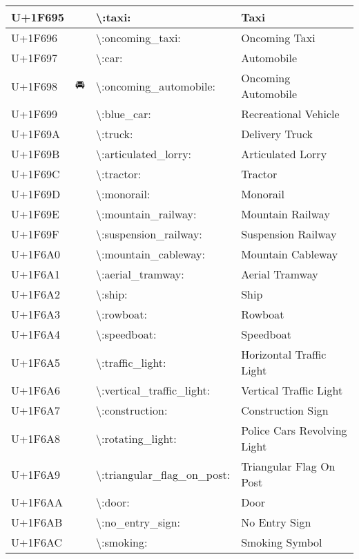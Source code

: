\begin{table}[h]
\begin{tabulary}{\linewidth}{|L|L|L|L|}
U+1F695 & 🚕 & {\textbackslash}:taxi: & Taxi \\
\hline
U+1F696 & 🚖 & {\textbackslash}:oncoming\_taxi: & Oncoming Taxi \\
\hline
U+1F697 & 🚗 & {\textbackslash}:car: & Automobile \\
\hline
U+1F698 & 🚘 & {\textbackslash}:oncoming\_automobile: & Oncoming Automobile \\
\hline
U+1F699 & 🚙 & {\textbackslash}:blue\_car: & Recreational Vehicle \\
\hline
U+1F69A & 🚚 & {\textbackslash}:truck: & Delivery Truck \\
\hline
U+1F69B & 🚛 & {\textbackslash}:articulated\_lorry: & Articulated Lorry \\
\hline
U+1F69C & 🚜 & {\textbackslash}:tractor: & Tractor \\
\hline
U+1F69D & 🚝 & {\textbackslash}:monorail: & Monorail \\
\hline
U+1F69E & 🚞 & {\textbackslash}:mountain\_railway: & Mountain Railway \\
\hline
U+1F69F & 🚟 & {\textbackslash}:suspension\_railway: & Suspension Railway \\
\hline
U+1F6A0 & 🚠 & {\textbackslash}:mountain\_cableway: & Mountain Cableway \\
\hline
U+1F6A1 & 🚡 & {\textbackslash}:aerial\_tramway: & Aerial Tramway \\
\hline
U+1F6A2 & 🚢 & {\textbackslash}:ship: & Ship \\
\hline
U+1F6A3 & 🚣 & {\textbackslash}:rowboat: & Rowboat \\
\hline
U+1F6A4 & 🚤 & {\textbackslash}:speedboat: & Speedboat \\
\hline
U+1F6A5 & 🚥 & {\textbackslash}:traffic\_light: & Horizontal Traffic Light \\
\hline
U+1F6A6 & 🚦 & {\textbackslash}:vertical\_traffic\_light: & Vertical Traffic Light \\
\hline
U+1F6A7 & 🚧 & {\textbackslash}:construction: & Construction Sign \\
\hline
U+1F6A8 & 🚨 & {\textbackslash}:rotating\_light: & Police Cars Revolving Light \\
\hline
U+1F6A9 & 🚩 & {\textbackslash}:triangular\_flag\_on\_post: & Triangular Flag On Post \\
\hline
U+1F6AA & 🚪 & {\textbackslash}:door: & Door \\
\hline
U+1F6AB & 🚫 & {\textbackslash}:no\_entry\_sign: & No Entry Sign \\
\hline
U+1F6AC & 🚬 & {\textbackslash}:smoking: & Smoking Symbol \\

\end{tabulary}
\end{table}
